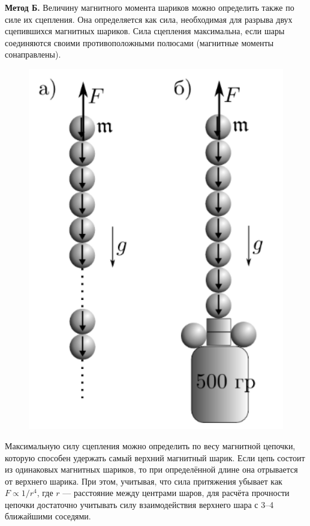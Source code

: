 \documentclass[a4paper,12pt]{article} %
\begin{document}
\hfill \break \textbf{Метод Б.} Величину магнитного момента шариков можно определить также по силе их сцепления. Она определяется как сила, необходимая для разрыва двух сцепившихся магнитных шариков. Сила сцепления максимальна, если шары соединяются своими противоположными полюсами (магнитные моменты сонаправлены).

\begin{figure}
\begin{center}
    \includegraphics[width=1\textwidth]{3.1.3_2.png}
\end{center}
\end{figure}


\hfill \break Максимальную силу сцепления можно определить по весу магнитной цепочки, которую способен удержать самый верхний магнитный шарик. Если цепь состоит из одинаковых магнитных шариков, то при определённой длине она отрывается от верхнего шарика. При этом, учитывая, что сила притяжения убывает как $F \propto 1/r^4$, где $r$ — расстояние между центрами шаров, для расчёта прочности цепочки достаточно учитывать силу взаимодействия верхнего шара с 3–4 ближайшими соседями.
\end{document}
